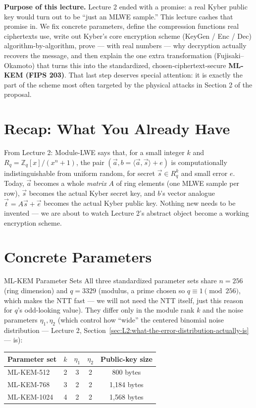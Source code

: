 \begin{notebox}
\small\textbf{Purpose of this lecture.} Lecture 2 ended with a promise: a real Kyber public key would turn out to be ``just an MLWE sample.'' This lecture cashes that promise in. We fix concrete parameters, define the compression functions real ciphertexts use, write out Kyber's core encryption scheme (KeyGen / Enc / Dec) algorithm-by-algorithm, prove --- with real numbers --- why decryption actually recovers the message, and then explain the one extra transformation (Fujisaki--Okamoto) that turns this into the standardized, chosen-ciphertext-secure \textbf{ML-KEM (FIPS 203)}. That last step deserves special attention: it is exactly the part of the scheme most often targeted by the physical attacks in Section 2 of the proposal.
\end{notebox}

\section{Recap: What You Already Have}
\label{sec:L3:recap-what-you-already-have}

From Lecture 2: Module-LWE says that, for a small integer $k$ and $R_q = \mathbb{Z}_q[x]/(x^n+1)$, the pair $(\vec a, b = \langle \vec a,\vec s\rangle + e)$ is computationally indistinguishable from uniform random, for secret $\vec s \in R_q^k$ and small error $e$. Today, $\vec a$ becomes a whole \emph{matrix} $A$ of ring elements (one MLWE sample per row), $\vec s$ becomes the actual Kyber secret key, and $b$'s vector analogue $\vec t = A\vec s + \vec e$ becomes the actual Kyber public key. Nothing new needs to be invented --- we are about to watch Lecture 2's abstract object become a working encryption scheme.

\section{Concrete Parameters}
\label{sec:L3:concrete-parameters}

\begin{defbox}{ML-KEM Parameter Sets}
All three standardized parameter sets share $n = 256$ (ring dimension) and $q = 3329$ (modulus, a prime chosen so $q \equiv 1 \pmod{256}$, which makes the NTT fast --- we will not need the NTT itself, just this reason for $q$'s odd-looking value). They differ only in the module rank $k$ and the noise parameters $\eta_1,\eta_2$ (which control how ``wide'' the centered binomial noise distribution --- Lecture 2, Section~\ref{sec:L2:what-the-error-distribution-actually-is} --- is):
\begin{center}
\begin{tabular}{|l|c|c|c|c|}
\hline
\textbf{Parameter set} & $k$ & $\eta_1$ & $\eta_2$ & Public-key size \\
\hline
ML-KEM-512  & 2 & 3 & 2 & 800 bytes \\
ML-KEM-768  & 3 & 2 & 2 & 1{,}184 bytes \\
ML-KEM-1024 & 4 & 2 & 2 & 1{,}568 bytes \\
\hline
\end{tabular}
\end{center}
\end{defbox}

